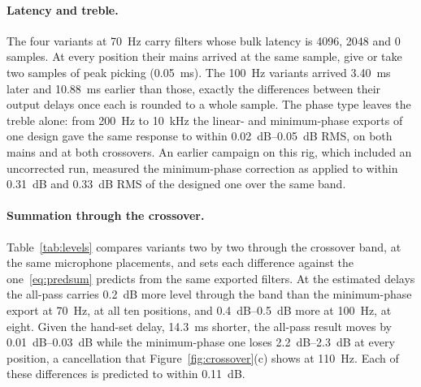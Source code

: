 \documentclass[10pt,a4paper]{article}
\begin{document}
\paragraph{Latency and treble.} The four variants at \SI{70}{\hertz} carry filters whose bulk latency is 4096, 2048 and 0 samples. At every position their mains arrived at the same sample, give or take two samples of peak picking (\SI{0.05}{\milli\second}). The \SI{100}{\hertz} variants arrived \SI{3.40}{\milli\second} later and \SI{10.88}{\milli\second} earlier than those, exactly the differences between their output delays once each is rounded to a whole sample. The phase type leaves the treble alone: from \SI{200}{\hertz} to \SI{10}{\kilo\hertz} the linear- and minimum-phase exports of one design gave the same response to within \SIrange{0.02}{0.05}{\dB} RMS, on both mains and at both crossovers. An earlier campaign on this rig, which included an uncorrected run, measured the minimum-phase correction as applied to within \SI{0.31}{\dB} and \SI{0.33}{\dB} RMS of the designed one over the same band.

\paragraph{Summation through the crossover.} Table~\ref{tab:levels} compares variants two by two through the crossover band, at the same microphone placements, and sets each difference against the one~\eqref{eq:predsum} predicts from the same exported filters. At the estimated delays the all-pass carries \SI{0.2}{\dB} more level through the band than the minimum-phase export at \SI{70}{\hertz}, at all ten positions, and \SIrange{0.4}{0.5}{\dB} more at \SI{100}{\hertz}, at eight. Given the hand-set delay, \SI{14.3}{\milli\second} shorter, the all-pass result moves by \SIrange{0.01}{0.03}{\dB} while the minimum-phase one loses \SIrange{2.2}{2.3}{\dB} at every position, a cancellation that Figure~\ref{fig:crossover}(c) shows at \SI{110}{\hertz}. Each of these differences is predicted to within \SI{0.11}{\dB}.
\end{document}
